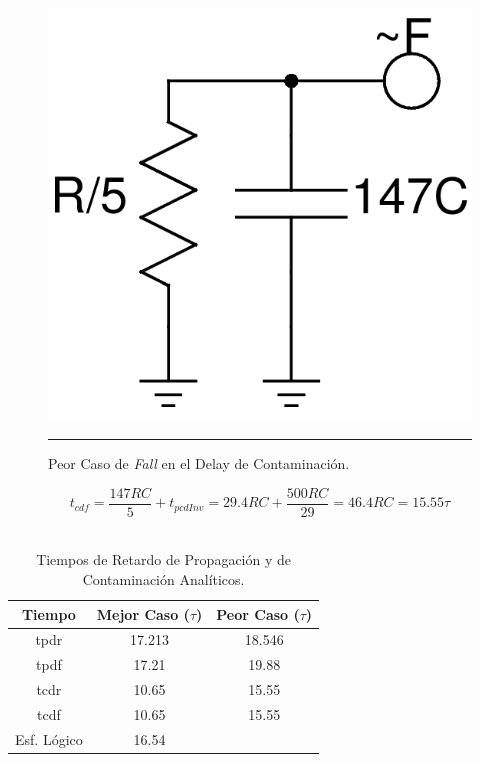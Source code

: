 \documentclass[12pt,a4paper]{article} %
\begin{document}
\begin{figure}[htbp]
  \centering
    \includegraphics[scale=0.25]{./Peor_Caso_Fall_contam.png}
    \rule{35em}{0.3pt}
  \caption[C_Carga]{Peor Caso de \textit{Fall} en el Delay de Contaminación.}
  \label{fig:Peor_Caso_Fall_contam}
\end{figure}

\begin{equation}\label{eqn:DelayC_Fall_Peor}
t_{cdf} = \frac{147RC}{5}+t_{pcdInv}=29.4RC+\frac{500RC}{29}=46.4RC=15.55\tau
\end{equation}\\


\begin{table}\label{table:TablaAnalitica}
\begin{center}
\begin{tabular}{c||c||c}
Tiempo  & Mejor Caso ($\tau$) & Peor Caso ($\tau$)\\
\hline
\hline
tpdr & 17.213 & 18.546 \\
tpdf & 17.21 & 19.88 \\
tcdr & 10.65 & 15.55\\
tcdf & 10.65 & 15.55\\
Esf. Lógico & 16.54\\
\hline
\end{tabular}
\caption{Tiempos de Retardo de Propagación y de Contaminación Analíticos.}
\end{center}
\end{table}
\end{document}
